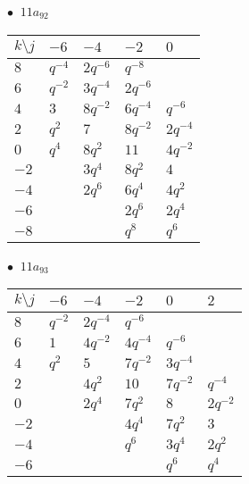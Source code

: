 \begin{minipage}{\linewidth}
$\bullet\ $ $11a_{92}$ \vspace{0.5em} \\
\begin{tabular}{l|llll}
$k \setminus j$ & $-6$ & $-4$ & $-2$ & $0$ \\
\hline
$8$ & $q^{-4}$ & $2q^{-6}$ & $q^{-8}$ &  \\
$6$ & $q^{-2}$ & $3q^{-4}$ & $2q^{-6}$ &  \\
$4$ & $3$ & $8q^{-2}$ & $6q^{-4}$ & $q^{-6}$ \\
$2$ & $q^{2}$ & $7$ & $8q^{-2}$ & $2q^{-4}$ \\
$0$ & $q^{4}$ & $8q^{2}$ & $11$ & $4q^{-2}$ \\
$-2$ &  & $3q^{4}$ & $8q^{2}$ & $4$ \\
$-4$ &  & $2q^{6}$ & $6q^{4}$ & $4q^{2}$ \\
$-6$ &  &  & $2q^{6}$ & $2q^{4}$ \\
$-8$ &  &  & $q^{8}$ & $q^{6}$ \\
\end{tabular}
\vspace{2em}
\end{minipage}
%
\begin{minipage}{\linewidth}
$\bullet\ $ $11a_{93}$ \vspace{0.5em} \\
\begin{tabular}{l|lllll}
$k \setminus j$ & $-6$ & $-4$ & $-2$ & $0$ & $2$ \\
\hline
$8$ & $q^{-2}$ & $2q^{-4}$ & $q^{-6}$ &  &  \\
$6$ & $1$ & $4q^{-2}$ & $4q^{-4}$ & $q^{-6}$ &  \\
$4$ & $q^{2}$ & $5$ & $7q^{-2}$ & $3q^{-4}$ &  \\
$2$ &  & $4q^{2}$ & $10$ & $7q^{-2}$ & $q^{-4}$ \\
$0$ &  & $2q^{4}$ & $7q^{2}$ & $8$ & $2q^{-2}$ \\
$-2$ &  &  & $4q^{4}$ & $7q^{2}$ & $3$ \\
$-4$ &  &  & $q^{6}$ & $3q^{4}$ & $2q^{2}$ \\
$-6$ &  &  &  & $q^{6}$ & $q^{4}$ \\
\end{tabular}
\vspace{2em}
\end{minipage}
%
